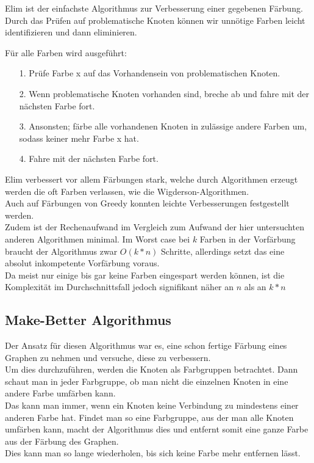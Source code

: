 \documentclass[11pt]{article}
\begin{document}
Elim ist der einfachste Algorithmus zur Verbesserung einer gegebenen Färbung. \\

Durch das Prüfen auf problematische Knoten können wir unnötige Farben leicht identifizieren und dann eliminieren.

Für alle Farben wird ausgeführt: \\
\begin{itemize}
\item[1.] Prüfe Farbe x auf das Vorhandensein von problematischen Knoten.
\item[2.] Wenn problematische Knoten vorhanden sind, breche ab und fahre mit der nächsten Farbe fort.
\item[3.] Ansonsten; färbe alle vorhandenen Knoten in zulässige andere Farben um, sodass keiner mehr Farbe x hat.
\item[4.] Fahre mit der nächsten Farbe fort.
\end{itemize}

Elim verbessert vor allem Färbungen stark, welche durch Algorithmen erzeugt werden die oft Farben verlassen, wie die Wigderson-Algorithmen. \\
Auch auf Färbungen von Greedy konnten leichte Verbesserungen festgestellt werden. \\
Zudem ist der Rechenaufwand im Vergleich zum Aufwand der hier untersuchten anderen Algorithmen minimal. Im Worst case bei $k$ Farben
in der Vorfärbung braucht der Algorithmus zwar $O(k*n)$ Schritte, allerdings setzt das eine absolut inkompetente Vorfärbung voraus. \\
Da meist nur einige bis gar keine Farben eingespart werden können, ist die Komplexität im Durchschnittsfall jedoch signifikant näher an $n$ als an $k*n$

\subsection{Make-Better Algorithmus} %

Der Ansatz für diesen Algorithmus war es, eine schon fertige Färbung eines Graphen zu nehmen und versuche, diese zu verbessern. \\
Um dies durchzuführen, werden die Knoten als Farbgruppen betrachtet. Dann schaut man in jeder Farbgruppe, ob man nicht die einzelnen Knoten in eine andere Farbe umfärben kann. \\
Das kann man immer, wenn ein Knoten keine Verbindung zu mindestens einer anderen Farbe hat. Findet man so eine Farbgruppe, aus der man alle Knoten umfärben kann, 
macht der Algorithmus dies und entfernt somit eine ganze Farbe aus der Färbung des Graphen. \\
Dies kann man so lange wiederholen, bis sich keine Farbe mehr entfernen lässt. \\
\end{document}
